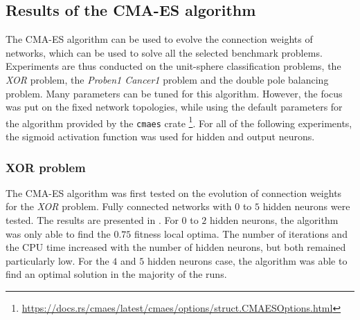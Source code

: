 \subsection{Results of the CMA-ES algorithm}

The CMA-ES algorithm can be used to evolve the connection weights of networks, which can be used to solve all the selected benchmark problems. Experiments are thus conducted on the unit-sphere
classification problems, the \textit{XOR} problem, the \textit{Proben1 Cancer1} problem and the double pole balancing problem. Many parameters can be tuned for this algorithm.
However, the focus was put on the fixed network topologies, while using the default parameters for the algorithm provided by the \texttt{cmaes}
crate \footnote{\url{https://docs.rs/cmaes/latest/cmaes/options/struct.CMAESOptions.html}}. For all of the following experiments, the sigmoid activation function was used for hidden
and output neurons.

\subsubsection{XOR problem}

The CMA-ES algorithm was first tested on the evolution of connection weights for the \textit{XOR} problem.
Fully connected networks with $0$ to $5$ hidden neurons were tested. The results are presented in .
For $0$ to $2$ hidden neurons, the algorithm was only able to find the $0.75$ fitness local optima. The number of iterations and the CPU time increased with the number of hidden neurons,
but both remained particularly low. For the $4$ and $5$ hidden neurons case, the algorithm was able to find an optimal solution in the majority of the runs.

